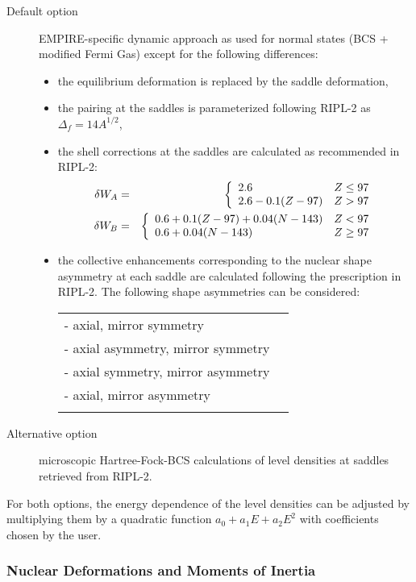 \begin{description}
\item[Default option] EMPIRE-specific dynamic approach as used for normal
states (BCS + modified Fermi Gas) except for the following differences:

\begin{itemize}
\item the equilibrium deformation is replaced by the saddle deformation,

\item the pairing at the saddles is parameterized following RIPL-2 as $%
\Delta_{f}=14A^{1/2}$,

\item the shell corrections at the saddles are calculated as recommended in RIPL-2:
\begin{eqnarray}
\delta W_{A}&=&\left\{
\begin{array}{lr}
2.6 & Z\leq97 \\
2.6-0.1(Z-97) & Z>97%
\end{array}%
\right.  \notag \\
\delta W_{B}&=&\left\{
\begin{array}{lr}
0.6+0.1(Z-97)+0.04(N-143) & Z<97 \\
0.6+0.04(N-143) & Z\geq97%
\end{array}%
\right.  \notag
\end{eqnarray}

\item the collective enhancements corresponding to the nuclear shape asymmetry
at each saddle are calculated following the prescription in RIPL-2. The
following shape asymmetries can be considered:
\begin{tabular}{ll}
- axial, mirror symmetry\tabularnewline - axial asymmetry, mirror symmetry%
\tabularnewline - axial symmetry, mirror asymmetry\tabularnewline - axial,
mirror asymmetry \tabularnewline &
\end{tabular}
\end{itemize}

\item[Alternative option] microscopic Hartree-Fock-BCS calculations of level
densities at saddles retrieved from RIPL-2.
\end{description}

For both options, the energy dependence of the level densities can be adjusted
by multiplying them by a quadratic function $%
a_{0}+a_{1}E+a_{2}E^{2}$ with coefficients chosen by the user.

\subsubsection{Nuclear Deformations and Moments of Inertia\label{sec: defor}}

